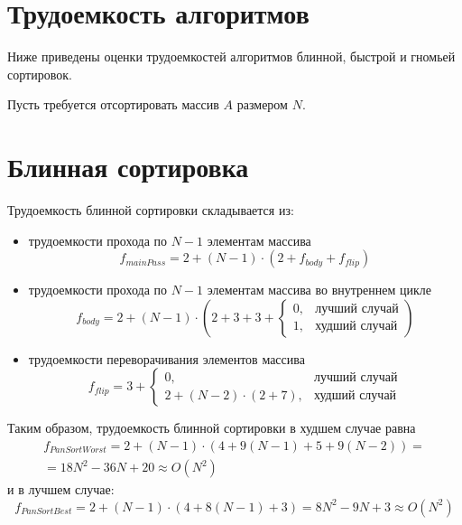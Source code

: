 \section{Трудоемкость алгоритмов}

Ниже приведены оценки трудоемкостей алгоритмов блинной, быстрой и гномьей сортировок.

Пусть требуется отсортировать массив $A$ размером $N$.

\section{Блинная сортировка}

Трудоемкость блинной сортировки складывается из:
\begin{itemize}
    \item трудоемкости прохода по $N - 1$ элементам массива
    \begin{equation}
        f_{mainPass} = 2 + (N - 1) \cdot (2 + f_{body} + f_{flip})
    \end{equation}
    \item трудоемкости прохода по $N - 1$ элементам массива во внутреннем цикле
    \begin{equation}
        f_{body} = 2 + (N - 1) \cdot \left (2 + 3 + 3 +
        \begin{cases}
            0, & \text{лучший случай} \\
            1, & \text{худший случай}
        \end{cases} \right )
    \end{equation}
    \item трудоемкости переворачивания элементов массива
    \begin{equation}
        f_{flip} = 3 + 
        \begin{cases}
            0, & \text{лучший случай} \\
            2 + (N - 2) \cdot (2 + 7), & \text{худший случай}
        \end{cases}
    \end{equation}
\end{itemize}

Таким образом, трудоемкость блинной сортировки в худшем случае равна
\begin{equation}
    \begin{gathered}
        f_{PanSortWorst} = 2 + (N - 1) \cdot (4 + 9(N - 1) + 5 + 9(N - 2)) = \\
        = 18N^2 - 36N + 20 \approx O(N^2)
    \end{gathered}
\end{equation}
и в лучшем случае:
\begin{equation}
        f_{PanSortBest} = 2 + (N - 1) \cdot (4 + 8(N - 1) + 3) = 8N^2 - 9N + 3 \approx O(N^2)
\end{equation}

